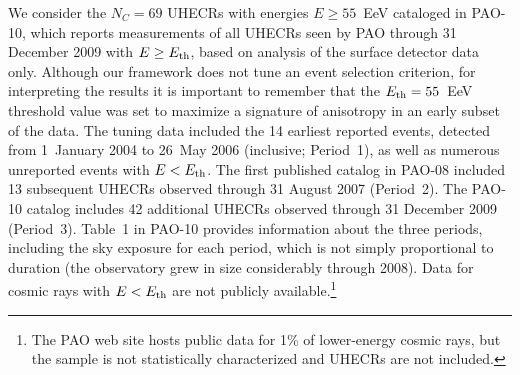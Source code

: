 We consider the $N_C = 69$ UHECRs with energies $E \geq 55$~EeV cataloged in
PAO-10, which reports measurements of all UHECRs seen by PAO through 31
December 2009 with $E \geq E_{\rm th}$, based on analysis of the surface detector
data only.  Although our framework does not tune an event selection
criterion, for interpreting the results it is important to remember that the
$E_{\rm th}=55$~EeV threshold value was set to maximize a signature of anisotropy
in an early subset of the data. 
The tuning data included the 14 earliest
reported events, detected from 1~January 2004 to 26~May 2006 (inclusive;
Period~1), as well as numerous unreported events with $E<E_{\rm th}$.  The first
published catalog in PAO-08 included 13 subsequent UHECRs observed through 31
August 2007 (Period~2).  The PAO-10 catalog includes 42 additional UHECRs
observed through 31 December 2009 (Period~3). Table~1 in PAO-10 provides
information about the three periods, including the sky exposure for each
period, which is not simply proportional to duration (the observatory grew in
size considerably through 2008).  Data for cosmic rays with $E < E_{\rm th}$ are not
publicly available.\footnote{The PAO web site hosts public data for 1\% of
lower-energy cosmic rays, but the sample is not statistically characterized
and UHECRs are not included.}

